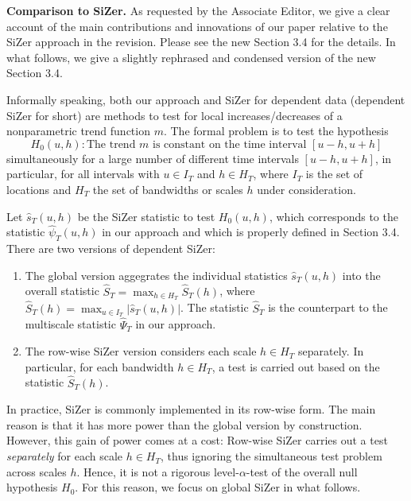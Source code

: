 \documentclass[a4paper,12pt]{article}
\begin{document}
\textbf{Comparison to SiZer.} As requested by the Associate Editor, we give a clear account of the main contributions and innovations of our paper relative to the SiZer approach in the revision. Please see the new Section 3.4 for the details. In what follows, we give a slightly rephrased and condensed version of the new Section 3.4. 


Informally speaking, both our approach and SiZer for dependent data (dependent SiZer for short) are methods to test for local increases/decreases of a nonparametric trend function $m$. The formal problem is to test the hypothesis
\[ H_0(u,h): \text{The trend } m \text{ is constant on the time interval } [u-h,u+h] \]
simultaneously for a large number of different time intervals $[u-h,u+h]$, in particular, for all intervals with $u \in I_T$ and $h \in H_T$, where $I_T$ is the set of locations and $H_T$ the set of bandwidths or scales $h$ under consideration. 


Let $\widehat{s}_T(u,h)$ be the SiZer statistic to test $H_0(u,h)$, which corresponds to the statistic $\widehat{\psi}_T(u,h)$ in our approach and which is properly defined in Section 3.4. There are two versions of dependent SiZer: 
\begin{enumerate}[label=(\alph*), leftmargin=0.8cm]

\item The global version aggegrates the individual statistics $\widehat{s}_T(u,h)$ into the overall statistic $\widehat{S}_T = \max_{h \in H_T} \widehat{S}_T(h)$, where $\widehat{S}_T(h) = \max_{u \in I_T} |\widehat{s}_T(u,h)|$. The statistic $\widehat{S}_T$ is the counterpart to the multiscale statistic $\widehat{\Psi}_T$ in our approach. 

\item The row-wise SiZer version considers each scale $h \in H_T$ separately. In particular, for each bandwidth $h \in H_T$, a test is carried out based on the statistic $\widehat{S}_T(h)$. 

\end{enumerate}
In practice, SiZer is commonly implemented in its row-wise form. The main reason is that it has more power than the global version by construction. However, this gain of power comes at a cost: Row-wise SiZer carries out a test \textit{separately} for each scale $h \in H_T$, thus ignoring the simultaneous test problem across scales $h$. Hence, it is not a rigorous level-$\alpha$-test of the overall null hypothesis $H_0$. For this reason, we focus on global SiZer in what follows. 
\end{document}
